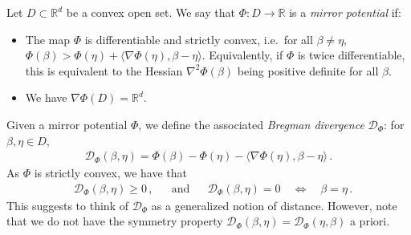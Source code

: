 \documentclass[11pt,reqno]{article}
\newcommand{\R}{\mathbb{R}}
\newcommand{\cD}{\mathcal{D}}
\renewcommand{\geq}{\geqslant}
\numberwithin{equation}{section}
\theoremstyle{plain}
\theoremstyle{definition}
\theoremstyle{remark}
\begin{document}
Let $D \subset \R^d$ be a convex open set. We say that $\Phi: D \to \R$ is a \emph{mirror potential} if:
\begin{itemize}
	\item The map $\Phi$ is differentiable and strictly convex, i.e.~for all $\beta \neq \eta$, $\Phi(\beta) > \Phi(\eta) + \langle \nabla \Phi(\eta), \beta - \eta \rangle$. Equivalently, if $\Phi$ is twice differentiable, this is equivalent to the Hessian $\nabla^2 \Phi(\beta)$ being positive definite for all $\beta$.
	\item We have $\nabla \Phi(D) = \R^d$. 
\end{itemize}
Given a mirror potential $\Phi$, we define the associated \emph{Bregman divergence} $\cD_\Phi$: for $\beta, \eta \in D$,
\begin{align*}
	\cD_\Phi(\beta, \eta) = \Phi(\beta) - \Phi(\eta) - \langle \nabla \Phi(\eta), \beta - \eta \rangle \, .
\end{align*}
As $\Phi$ is strictly convex, we have that 
\begin{align*}
	&\cD_\Phi(\beta, \eta) \geq 0 \, , &&\text{and} &&\cD_\Phi(\beta, \eta) = 0 \quad \Leftrightarrow \quad \beta = \eta \, .
\end{align*}
This suggests to think of $\cD_\Phi$ as a generalized notion of distance. However, note that we do not have the symmetry property $\cD_\Phi(\beta, \eta) = \cD_\Phi(\eta, \beta)$ a priori. 
\end{document}
